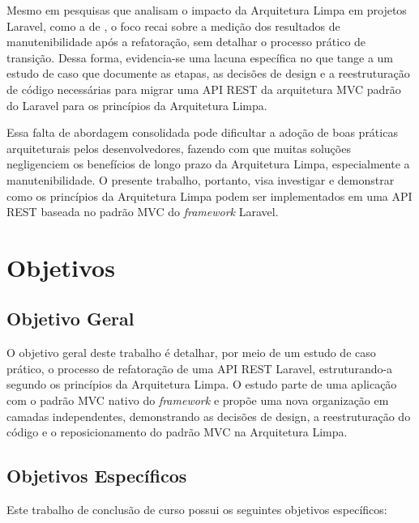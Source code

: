         \par Mesmo em pesquisas que analisam o impacto da Arquitetura Limpa em projetos Laravel, como a de \cite{inproceedings:nugroho:2022}, o foco recai sobre a medição dos resultados de manutenibilidade após a refatoração, sem detalhar o processo prático de transição. Dessa forma, evidencia-se uma lacuna específica no que tange a um estudo de caso que documente as etapas, as decisões de design e a reestruturação de código necessárias para migrar uma API REST da arquitetura MVC padrão do Laravel para os princípios da Arquitetura Limpa.
        
        \par Essa falta de abordagem consolidada pode dificultar a adoção de boas práticas arquiteturais pelos desenvolvedores, fazendo com que muitas soluções negligenciem os benefícios de longo prazo da Arquitetura Limpa, especialmente a manutenibilidade. O presente trabalho, portanto, visa investigar e demonstrar como os princípios da Arquitetura Limpa podem ser implementados em uma API REST baseada no padrão MVC do \textit{framework} Laravel.
        
    \section{Objetivos}
        \subsection{Objetivo Geral}

            \par O objetivo geral deste trabalho é detalhar, por meio de um estudo de caso prático, o processo de refatoração de uma API REST Laravel, estruturando-a segundo os princípios da Arquitetura Limpa. O estudo parte de uma aplicação com o padrão MVC nativo do \textit{framework} e propõe uma nova organização em camadas independentes, demonstrando as decisões de design, a reestruturação do código e o reposicionamento do padrão MVC na Arquitetura Limpa.

        \subsection{Objetivos Específicos}
            \par Este trabalho de conclusão de curso possui os seguintes objetivos específicos:

